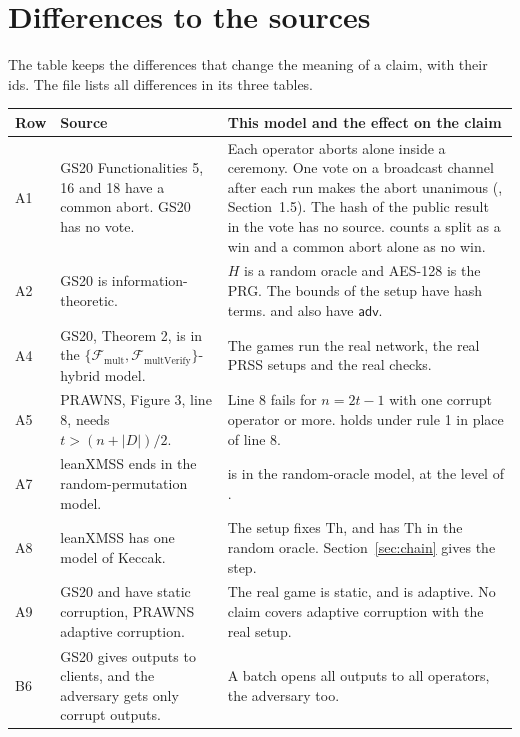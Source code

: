 \documentclass[11pt]{article}
\newcommand{\Th}{\mathrm{Th}}
\newcommand{\Fn}[1]{\mathcal F_{\mathrm{#1}}}
\newcommand{\rowrule}{\specialrule{0.2pt}{2.5pt}{2.5pt}}
\begin{document}
\section{Differences to the sources}\label{sec:diff}
The table keeps the differences that change the meaning of a claim, with their ids. The file
 lists all differences in its three tables.
{\footnotesize
\begin{xltabular}{\textwidth}{@{}l>{\raggedright\arraybackslash}X>{\raggedright\arraybackslash}X@{}}
\toprule
Row & Source & This model and the effect on the claim \\
\midrule
\endhead
A1 & GS20 Functionalities 5, 16 and 18 have a common abort. GS20 has no vote. & Each operator
aborts alone inside a ceremony. One vote on a broadcast channel after each run makes the abort
unanimous (\cite{GL05}, Section~1.5). The hash of the public result in the vote has no source.
 counts a split as a win and a common abort alone as no win. \\
\rowrule
A2 & GS20 is information-theoretic. & $H$ is a random oracle and AES-128 is the PRG. The bounds of
the setup have hash terms.  and  also have $\mathsf{adv}$. \\
\rowrule
A4 & GS20, Theorem 2, is in the $\{\Fn{mult},\Fn{multVerify}\}$-hybrid model. & The games run the
real network, the real PRSS setups and the real checks. \\
\rowrule
A5 & PRAWNS, Figure 3, line 8, needs $t>(n+|D|)/2$. & Line 8 fails for $n=2t-1$ with one corrupt
operator or more.  holds under rule 1 in place of line 8. \\
\rowrule
A7 & leanXMSS ends in the random-permutation model. &  is in the
random-oracle model, at the level of . \\
\rowrule
A8 & leanXMSS has one model of Keccak. & The setup fixes $\Th$, and  has
$\Th$ in the random oracle. Section~\ref{sec:chain} gives the step. \\
\rowrule
A9 & GS20 and \cite{GJM+21} have static corruption, PRAWNS adaptive corruption. & The real game is
static, and  is adaptive. No claim covers adaptive corruption with the real setup. \\
\rowrule
B6 & GS20 gives outputs to clients, and the adversary gets only corrupt outputs. & A batch opens
all outputs to all operators, the adversary too. \\

\end{xltabular}}
\end{document}

